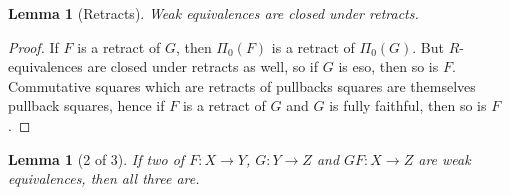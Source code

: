 \documentclass{amsart}
\theoremstyle{plain}
\newtheorem{lemma}[theorem]{Lemma}
\theoremstyle{definition}
\newcommand\hide[1]{}
\begin{document}
\begin{lemma}[Retracts] Weak equivalences are closed under retracts. \label{retracts}\end{lemma}

\begin{proof} If $F$ is a retract of $G$, then $\Pi_0(F)$ is a retract of $\Pi_0(G)$. But $R$-equivalences are closed under retracts as well, so if $G$ is eso, then so is $F$. Commutative squares which are retracts of pullbacks squares are themselves pullback squares, hence if $F$ is a retract of $G$ and $G$ is fully faithful, then so is $F$.\hide{Echt waar!?}
\end{proof}

\begin{lemma}[2 of 3] If two of $F:X\to Y$, $G:Y\to Z$ and $GF:X\to Z$ are weak equivalences, then all three are. \label{2of3}\end{lemma}
\end{document}
